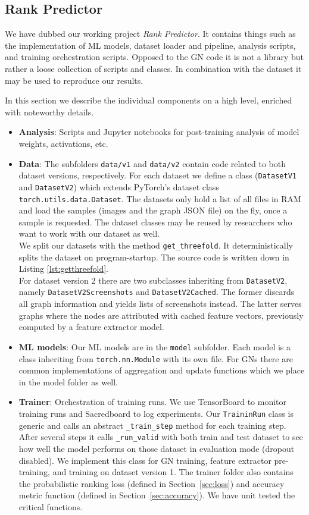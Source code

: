 \subsection{Rank Predictor}

We have dubbed our working project \textit{Rank Predictor}. It contains things such as the implementation of ML models, dataset loader and pipeline, analysis scripts, and training orchestration scripts. Opposed to the GN code it is not a library but rather a loose collection of scripts and classes. In combination with the dataset it may be used to reproduce our results.

In this section we describe the individual components on a high level, enriched with noteworthy details.

\begin{itemize}
    \item \textbf{Analysis}: Scripts and Jupyter notebooks for post-training analysis of model weights, activations, etc.
    \item \textbf{Data}: The subfolders \texttt{data/v1} and \texttt{data/v2} contain code related to both dataset versions, respectively. For each dataset we define a class (\texttt{DatasetV1} and \texttt{DatasetV2}) which extends PyTorch's dataset class \texttt{torch.utils.data.Dataset}. The datasets only hold a list of all files in RAM and load the samples (images and the graph JSON file) on the fly, once a sample is requested. The dataset classes may be reused by researchers who want to work with our dataset as well.\\
    We split our datasets with the method \texttt{get\_threefold}. It deterministically splits the dataset on program-startup. The source code is written down in Listing \ref{lst:getthreefold}.\\
    For dataset version 2 there are two subclasses inheriting from \texttt{DatasetV2}, namely \texttt{DatasetV2Screenshots} and \texttt{DatasetV2Cached}. The former discards all graph information and yields lists of screenshots instead. The latter serves graphs where the nodes are attributed with cached feature vectors, previously computed by a feature extractor model.
    \item \textbf{ML models}: Our ML models are in the \texttt{model} subfolder. Each model is a class inheriting from \texttt{torch.nn.Module} with its own file. For GNs there are common implementations of aggregation and update functions which we place in the model folder as well.
    \item \textbf{Trainer}: Orchestration of training runs. We use TensorBoard to monitor training runs and Sacredboard to log experiments. Our \texttt{TraininRun} class is generic and calls an abstract \texttt{\_train\_step} method for each training step. After several steps it calls \texttt{\_run\_valid} with both train and test dataset to see how well the model performs on those dataset in evaluation mode (dropout disabled). We implement this class for GN training, feature extractor pre-training, and training on dataset version 1. The trainer folder also contains the probabilistic ranking loss (defined in Section~\ref{sec:loss}) and accuracy metric function (defined in Section~\ref{sec:accuracy}). We have unit tested the critical functions.
\end{itemize}
